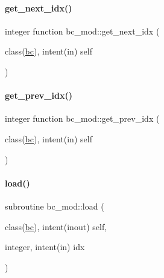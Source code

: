 \mbox{\label{namespacebc__mod_a783b0c98351bbb1c0f2262e54ab0ab84}} 
\paragraph{\texorpdfstring{get\+\_\+next\+\_\+idx()}{get\_next\_idx()}}
{\footnotesize\ttfamily integer function bc\+\_\+mod\+::get\+\_\+next\+\_\+idx (\begin{DoxyParamCaption}\item[{class(\mbox{\hyperlink{structbc__mod_1_1bc}{bc}}), intent(in)}]{self }\end{DoxyParamCaption})\hspace{0.3cm}{\ttfamily [private]}}

\mbox{\label{namespacebc__mod_a5caff070a863ad08db22d85ca7e0b8b9}} 
\paragraph{\texorpdfstring{get\+\_\+prev\+\_\+idx()}{get\_prev\_idx()}}
{\footnotesize\ttfamily integer function bc\+\_\+mod\+::get\+\_\+prev\+\_\+idx (\begin{DoxyParamCaption}\item[{class(\mbox{\hyperlink{structbc__mod_1_1bc}{bc}}), intent(in)}]{self }\end{DoxyParamCaption})\hspace{0.3cm}{\ttfamily [private]}}

\mbox{\label{namespacebc__mod_a3804f8b1aae5d58c9bb3f7fa88ff29c9}} 
\paragraph{\texorpdfstring{load()}{load()}}
{\footnotesize\ttfamily subroutine bc\+\_\+mod\+::load (\begin{DoxyParamCaption}\item[{class(\mbox{\hyperlink{structbc__mod_1_1bc}{bc}}), intent(inout)}]{self,  }\item[{integer, intent(in)}]{idx }\end{DoxyParamCaption})\hspace{0.3cm}{\ttfamily [private]}}

